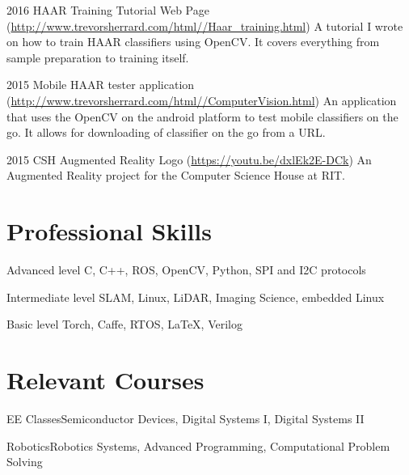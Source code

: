 \documentclass{tccv}
\begin{document}
\begin{yearlist}

\item{2016}
     {HAAR Training Tutorial Web Page (\href{http://www.trevorsherrard.com/html/Haar_training.html}{http://www.trevorsherrard.com/html/\newline/Haar\_training.html})}
     {A tutorial I wrote on how to train HAAR classifiers using OpenCV. It covers everything from sample preparation to training itself.}
     
\item{2015}
     {Mobile HAAR tester application (\href{http://www.trevorsherrard.com/html/ComputerVision.html}{http://www.trevorsherrard.com/html/\newline/ComputerVision.html})}
     {An application that uses the OpenCV on the android platform to test mobile classifiers on the go. It allows for downloading of classifier on the go from a URL.}
     
\item{2015}
     {CSH Augmented Reality Logo (\href{https://youtu.be/dxlEk2E-DCk}{https://youtu.be/dxlEk2E-DCk})}
     {An Augmented Reality project for the Computer Science House at RIT.}

\end{yearlist}


\section{Professional Skills}
\begin{factlist}

\item{Advanced  level}
     {C, C++, ROS, OpenCV, Python, SPI and I2C protocols}

\item{Intermediate level}
     {SLAM, Linux, LiDAR, Imaging Science, embedded Linux}

\item{Basic level}
     {Torch, Caffe, RTOS, \LaTeX, Verilog}

\end{factlist}

\section{Relevant Courses}
\begin{factlist}

\item{EE Classes}{Semiconductor Devices, Digital Systems I, Digital Systems II}

\item{Robotics}{Robotics Systems, Advanced Programming, Computational Problem Solving}

\end{factlist}
\end{document}
